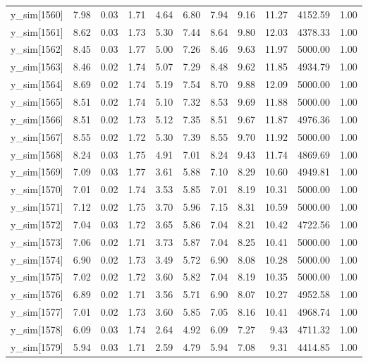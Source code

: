 \begin{table}[ht]
\begin{tabular}{rrrrrrrrrrr}
  y\_sim[1560] & 7.98 & 0.03 & 1.71 & 4.64 & 6.80 & 7.94 & 9.16 & 11.27 & 4152.59 & 1.00 \\ 
  y\_sim[1561] & 8.62 & 0.03 & 1.73 & 5.30 & 7.44 & 8.64 & 9.80 & 12.03 & 4378.33 & 1.00 \\ 
  y\_sim[1562] & 8.45 & 0.03 & 1.77 & 5.00 & 7.26 & 8.46 & 9.63 & 11.97 & 5000.00 & 1.00 \\ 
  y\_sim[1563] & 8.46 & 0.02 & 1.74 & 5.07 & 7.29 & 8.48 & 9.62 & 11.85 & 4934.79 & 1.00 \\ 
  y\_sim[1564] & 8.69 & 0.02 & 1.74 & 5.19 & 7.54 & 8.70 & 9.88 & 12.09 & 5000.00 & 1.00 \\ 
  y\_sim[1565] & 8.51 & 0.02 & 1.74 & 5.10 & 7.32 & 8.53 & 9.69 & 11.88 & 5000.00 & 1.00 \\ 
  y\_sim[1566] & 8.51 & 0.02 & 1.73 & 5.12 & 7.35 & 8.51 & 9.67 & 11.87 & 4976.36 & 1.00 \\ 
  y\_sim[1567] & 8.55 & 0.02 & 1.72 & 5.30 & 7.39 & 8.55 & 9.70 & 11.92 & 5000.00 & 1.00 \\ 
  y\_sim[1568] & 8.24 & 0.03 & 1.75 & 4.91 & 7.01 & 8.24 & 9.43 & 11.74 & 4869.69 & 1.00 \\ 
  y\_sim[1569] & 7.09 & 0.03 & 1.77 & 3.61 & 5.88 & 7.10 & 8.29 & 10.60 & 4949.81 & 1.00 \\ 
  y\_sim[1570] & 7.01 & 0.02 & 1.74 & 3.53 & 5.85 & 7.01 & 8.19 & 10.31 & 5000.00 & 1.00 \\ 
  y\_sim[1571] & 7.12 & 0.02 & 1.75 & 3.70 & 5.96 & 7.15 & 8.31 & 10.59 & 5000.00 & 1.00 \\ 
  y\_sim[1572] & 7.04 & 0.03 & 1.72 & 3.65 & 5.86 & 7.04 & 8.21 & 10.42 & 4722.56 & 1.00 \\ 
  y\_sim[1573] & 7.06 & 0.02 & 1.71 & 3.73 & 5.87 & 7.04 & 8.25 & 10.41 & 5000.00 & 1.00 \\ 
  y\_sim[1574] & 6.90 & 0.02 & 1.73 & 3.49 & 5.72 & 6.90 & 8.08 & 10.28 & 5000.00 & 1.00 \\ 
  y\_sim[1575] & 7.02 & 0.02 & 1.72 & 3.60 & 5.82 & 7.04 & 8.19 & 10.35 & 5000.00 & 1.00 \\ 
  y\_sim[1576] & 6.89 & 0.02 & 1.71 & 3.56 & 5.71 & 6.90 & 8.07 & 10.27 & 4952.58 & 1.00 \\ 
  y\_sim[1577] & 7.01 & 0.02 & 1.73 & 3.60 & 5.85 & 7.05 & 8.16 & 10.41 & 4968.74 & 1.00 \\ 
  y\_sim[1578] & 6.09 & 0.03 & 1.74 & 2.64 & 4.92 & 6.09 & 7.27 & 9.43 & 4711.32 & 1.00 \\ 
  y\_sim[1579] & 5.94 & 0.03 & 1.71 & 2.59 & 4.79 & 5.94 & 7.08 & 9.31 & 4414.85 & 1.00 \\ 

\end{tabular}
\end{table}
